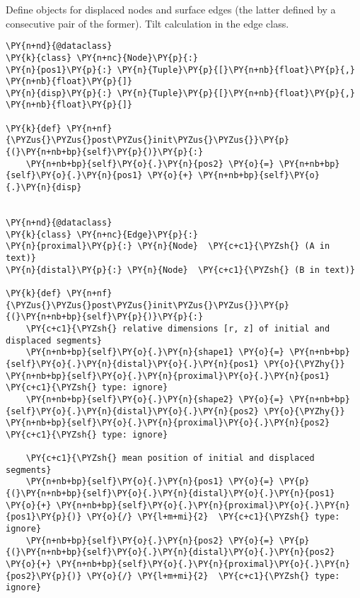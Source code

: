 Define objects for displaced nodes and surface edges (the latter defined
by a consecutive pair of the former). Tilt calculation in the edge
class.

\begin{tcolorbox}[breakable, size=fbox, boxrule=1pt, pad at break*=1mm,colback=cellbackground, colframe=cellborder]
\begin{Verbatim}[commandchars=\\\{\}]
\PY{n+nd}{@dataclass}
\PY{k}{class} \PY{n+nc}{Node}\PY{p}{:}
\PY{n}{pos1}\PY{p}{:} \PY{n}{Tuple}\PY{p}{[}\PY{n+nb}{float}\PY{p}{,} \PY{n+nb}{float}\PY{p}{]}
\PY{n}{disp}\PY{p}{:} \PY{n}{Tuple}\PY{p}{[}\PY{n+nb}{float}\PY{p}{,} \PY{n+nb}{float}\PY{p}{]}

\PY{k}{def} \PY{n+nf}{\PYZus{}\PYZus{}post\PYZus{}init\PYZus{}\PYZus{}}\PY{p}{(}\PY{n+nb+bp}{self}\PY{p}{)}\PY{p}{:}
    \PY{n+nb+bp}{self}\PY{o}{.}\PY{n}{pos2} \PY{o}{=} \PY{n+nb+bp}{self}\PY{o}{.}\PY{n}{pos1} \PY{o}{+} \PY{n+nb+bp}{self}\PY{o}{.}\PY{n}{disp}


\PY{n+nd}{@dataclass}
\PY{k}{class} \PY{n+nc}{Edge}\PY{p}{:}
\PY{n}{proximal}\PY{p}{:} \PY{n}{Node}  \PY{c+c1}{\PYZsh{} (A in text)}
\PY{n}{distal}\PY{p}{:} \PY{n}{Node}  \PY{c+c1}{\PYZsh{} (B in text)}

\PY{k}{def} \PY{n+nf}{\PYZus{}\PYZus{}post\PYZus{}init\PYZus{}\PYZus{}}\PY{p}{(}\PY{n+nb+bp}{self}\PY{p}{)}\PY{p}{:}
    \PY{c+c1}{\PYZsh{} relative dimensions [r, z] of initial and displaced segments}
    \PY{n+nb+bp}{self}\PY{o}{.}\PY{n}{shape1} \PY{o}{=} \PY{n+nb+bp}{self}\PY{o}{.}\PY{n}{distal}\PY{o}{.}\PY{n}{pos1} \PY{o}{\PYZhy{}} \PY{n+nb+bp}{self}\PY{o}{.}\PY{n}{proximal}\PY{o}{.}\PY{n}{pos1}  \PY{c+c1}{\PYZsh{} type: ignore}
    \PY{n+nb+bp}{self}\PY{o}{.}\PY{n}{shape2} \PY{o}{=} \PY{n+nb+bp}{self}\PY{o}{.}\PY{n}{distal}\PY{o}{.}\PY{n}{pos2} \PY{o}{\PYZhy{}} \PY{n+nb+bp}{self}\PY{o}{.}\PY{n}{proximal}\PY{o}{.}\PY{n}{pos2}  \PY{c+c1}{\PYZsh{} type: ignore}

    \PY{c+c1}{\PYZsh{} mean position of initial and displaced segments}
    \PY{n+nb+bp}{self}\PY{o}{.}\PY{n}{pos1} \PY{o}{=} \PY{p}{(}\PY{n+nb+bp}{self}\PY{o}{.}\PY{n}{distal}\PY{o}{.}\PY{n}{pos1} \PY{o}{+} \PY{n+nb+bp}{self}\PY{o}{.}\PY{n}{proximal}\PY{o}{.}\PY{n}{pos1}\PY{p}{)} \PY{o}{/} \PY{l+m+mi}{2}  \PY{c+c1}{\PYZsh{} type: ignore}
    \PY{n+nb+bp}{self}\PY{o}{.}\PY{n}{pos2} \PY{o}{=} \PY{p}{(}\PY{n+nb+bp}{self}\PY{o}{.}\PY{n}{distal}\PY{o}{.}\PY{n}{pos2} \PY{o}{+} \PY{n+nb+bp}{self}\PY{o}{.}\PY{n}{proximal}\PY{o}{.}\PY{n}{pos2}\PY{p}{)} \PY{o}{/} \PY{l+m+mi}{2}  \PY{c+c1}{\PYZsh{} type: ignore}


\end{Verbatim}
\end{tcolorbox}
